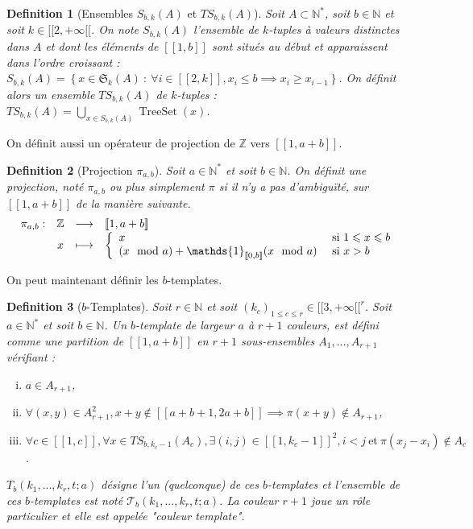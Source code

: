 \documentclass{article}
\newtheorem{definition}{Definition}[section]
\DeclareMathOperator{\treeset}{TreeSet}
\newcommand{\TS}{\mathit{TS}}
\begin{document}
\begin{definition}[Ensembles \(S_{b,k}(A)\) et \(\TS_{b,k}(A)\)]
Soit \(A \subset \mathbb{N}^*\), soit \(b \in \mathbb{N}\) et soit \(k \in [\![2, +\infty[\![\). On note \(S_{b,k}(A)\) l'ensemble de \(k\)-tuples  à valeurs distinctes dans \(A\) et dont les éléments de \([\![1, b]\!]\) sont situés au début et apparaissent dans l'ordre croissant :\\
\(S_{b,k}(A) = \left\{ x \in \mathfrak{S}_k(A) ~:~ \forall i \in  [\![2, k]\!], x_i \leqslant b \implies x_i \geqslant x_{i -1} \right\}\). On définit alors un ensemble \(\TS_{b,k}(A)\) de \(k\)-tuples : \(\TS_{b,k}(A) = \displaystyle\bigcup\limits_{x \in S_{b,k}(A)} \treeset(x)\).
\end{definition}

On définit aussi un opérateur de projection de \(\mathbb{Z}\) vers \([\![1, a + b]\!]\).

\begin{definition}[Projection \(\pi_{a, b}\)]
Soit \(a \in \mathbb{N}^*\) et soit \(b \in \mathbb{N}\). On définit une projection, noté \(\pi_{a, b}\) ou plus simplement \(\pi\) si il n'y a pas d'ambiguïté, sur \([\![1, a + b]\!]\) de la manière suivante.
\[ \begin{array}{c c c l}
	\pi_{a, b} : & \mathbb{Z} & \longrightarrow & [\![1, a + b]\!] \\
	 & x & \longmapsto & 
		\left\{
		\begin{array}{l l}
			x & ~\text{si}~ 1 \leqslant x \leqslant b \\
			(x \mod a) + \mathds{1}_{[\![0, b]\!]}(x \mod a) & ~\text{si}~ x > b
		\end{array}
		\right.
\end{array} \]
\end{definition}

On peut maintenant définir les \(b\)-templates.

\begin{definition}[\(b\)-Templates]
Soit \(r \in \mathbb{N}\) et soit \((k_c)_{1 \leqslant c \leqslant r} \in {[\![3, +\infty[\![}^r\). Soit \(a \in \mathbb{N}^*\) et soit \(b \in \mathbb{N}\).  Un \(b\)-template de largeur \(a\) à \(r + 1\) couleurs, est défini comme une partition de \([\![1, a + b]\!]\) en \(r+1\) sous-ensembles \(A_1, ..., A_{r+1}\) vérifiant :
\begin{enumerate}[(i)]
\item \(a \in A_{r+1}\),
\item \(\forall (x, y) \in A_{r + 1}^2, x + y \notin [\![a + b + 1, 2 a + b]\!] \implies \pi(x + y) \notin A_{r + 1}\),
\item \(\forall c \in [\![1, c]\!], \forall x \in \TS_{b, k_c - 1}(A_c), \exists (i, j) \in {[\![1, k_c - 1]\!]}^2, i < j ~\text{et}~ \pi(x_j - x_i) \notin A_c\).
\end{enumerate}
 \(T_b(k_1, ..., k_r, t; a)\) désigne l'un (quelconque) de ces \(b\)-templates et l'ensemble de ces \(b\)-templates est noté \(\mathcal{T}_b(k_1, ..., k_r, t; a)\).  La couleur \(r + 1\) joue un rôle particulier et elle est appelée "couleur template".
\end{definition}
\end{document}
